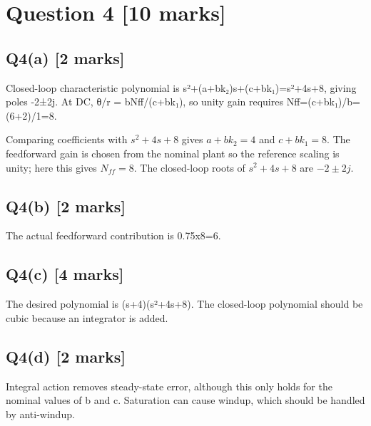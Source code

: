 \documentclass[11pt,a4paper]{article}
\begin{document}
\section*{Question 4 \hfill [10 marks]}
\subsection*{Q4(a) \hfill [2 marks]}

Closed-loop characteristic polynomial is s²+(a+bk₂)s+(c+bk₁)=s²+4s+8, giving poles -2±2j.
At DC, θ/r = bNff/(c+bk₁), so unity gain requires Nff=(c+bk₁)/b=(6+2)/1=8.\par\smallskip Comparing coefficients with $s^2+4s+8$ gives $a+bk_2=4$ and $c+bk_1=8$. The feedforward gain is chosen from the nominal plant so the reference scaling is unity; here this gives $N_{ff}=8$. The closed-loop roots of $s^2+4s+8$ are $-2\pm2j$.

\subsection*{Q4(b) \hfill [2 marks]}

The actual feedforward contribution is 0.75x8=6.

\subsection*{Q4(c) \hfill [4 marks]}

The desired polynomial is (s+4)(s²+4s+8).
The closed-loop polynomial should be cubic because an integrator is added.

\subsection*{Q4(d) \hfill [2 marks]}

Integral action removes steady-state error, although this only holds for the nominal values of b and c.
Saturation can cause windup, which should be handled by anti-windup.
\end{document}
